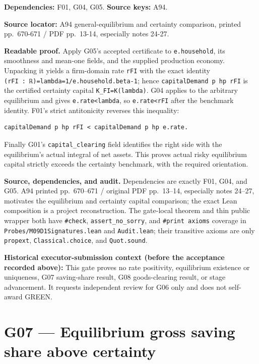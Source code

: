 \documentclass[
  11pt,
]{article}
\let\LedgerOriginalTexttt\texttt
\renewcommand{\texttt}[1]{{\small\LedgerOriginalTexttt{#1}}}
\begin{document}
\textbf{Dependencies:} F01, G04, G05. \textbf{Source keys:} A94.

\textbf{Source locator:} A94 general-equilibrium and certainty
comparison, printed pp.~670-671 / PDF pp.~13-14, especially notes 24-27.

\textbf{Readable proof.} Apply G05's accepted certificate to
\texttt{e.household}, its smoothness and mean-one fields, and the
supplied production economy. Unpacking it yields a firm-domain rate
\texttt{rFI} with the exact identity
\texttt{(rFI\ :\ ℝ)=lambda=1/e.household.beta-1}; hence
\texttt{capitalDemand\ p\ hp\ rFI} is the certified certainty capital
\texttt{K\_FI=K(lambda)}. G04 applies to the arbitrary equilibrium and
gives \texttt{e.rate\textless{}lambda}, so \texttt{e.rate\textless{}rFI}
after the benchmark identity. F01's strict antitonicity reverses this
inequality:

\begin{verbatim}
capitalDemand p hp rFI < capitalDemand p hp e.rate.
\end{verbatim}

Finally G01's \texttt{capital\_clearing} field identifies the right side
with the equilibrium's actual integral of net assets. This proves actual
risky equilibrium capital strictly exceeds the certainty benchmark, with
the required orientation.

\textbf{Source, dependencies, and audit.} Dependencies are exactly F01,
G04, and G05. A94 printed pp.~670--671 / original PDF pp.~13--14,
especially notes 24--27, motivates the equilibrium and certainty capital
comparison; the exact Lean composition is a project reconstruction. The
gate-local theorem and thin public wrapper both have \texttt{\#check},
\texttt{assert\_no\_sorry}, and \texttt{\#print\ axioms} coverage in
\texttt{Probes/M09D1Signatures.lean} and \texttt{Audit.lean}; their
transitive axioms are only \texttt{propext}, \texttt{Classical.choice},
and \texttt{Quot.sound}.

\textbf{Historical executor-submission context (before the acceptance
recorded above):} This gate proves no rate positivity, equilibrium
existence or uniqueness, G07 saving-share result, G08 goods-clearing
result, or stage advancement. It requests independent review for G06
only and does not self-award GREEN.

\section{G07 --- Equilibrium gross saving share above
certainty}\label{g07-equilibrium-gross-saving-share-above-certainty}
\end{document}
